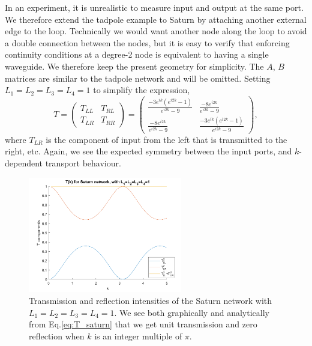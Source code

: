 In an experiment, it is unrealistic to measure input and output at the same port. We therefore extend the tadpole example to Saturn by attaching another external edge to the loop. Technically we would want another node along the loop to avoid a double connection between the nodes, but it is easy to verify that enforcing continuity conditions at a degree-2 node is equivalent to having a single waveguide. We therefore keep the present geometry for simplicity. The $A$, $B$ matrices are similar to the tadpole network and will be omitted. Setting  $L_1=L_2=L_3=L_4=1$ to simplify the expression,
\begin{equation}
    \label{eq:T_saturn}
    T  = \begin{pmatrix}
        T_{LL} & T_{RL}\\[0.3em] 
        T_{LR} & T_{RR} 
          \end{pmatrix}
    = \begin{pmatrix}
        \frac{-3e^{ik}(e^{i2k}-1)}{e^{i2k}-9} & \frac{-8e^{i2k}}{e^{i2k}-9}\\[0.3em] \frac{-8e^{i2k}}{e^{i2k}-9} & \frac{-3e^{ik}(e^{i2k}-1)}{e^{i2k}-9}
          \end{pmatrix},
\end{equation}
where $T_{LR}$ is the component of input from the left that is transmitted to the right, etc. Again, we see the expected symmetry between the input ports, and $k$-dependent transport behaviour.

\begin{figure}[h]
  \centering
    \includegraphics[width=0.6\textwidth]{ch2/fig2/saturn_T.png}
    \caption{Transmission and reflection intensities of the Saturn network with $L_1=L_2=L_3=L_4=1$. We see both graphically and analytically from Eq.\ref{eq:T_saturn} that we get unit transmission and zero reflection when $k$ is an integer multiple of $\pi$.}
    \label{fig:T_saturn}
\end{figure}

